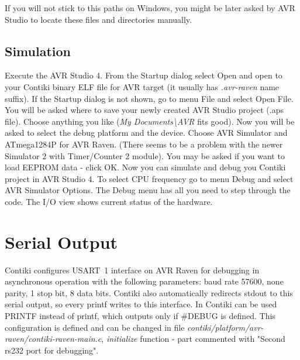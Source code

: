 \documentclass{article}
\begin{document}
{{If you will not stick to this paths on Windows,
you might be later asked by AVR Studio to locate these files and directories manually.

\subsection{Simulation}
Execute the AVR Studio 4.
From the Startup dialog select Open and open to your Contiki binary ELF file for AVR target
(it usually has {\it{.avr-raven}} name suffix).
If the Startup dialog is not shown, go to menu File and select Open File.
You will be asked where to save your newly created AVR Studio project (.aps file).
Choose anything you like ({\it{My Documents\textbackslash AVR}} fits good).
Now you will be asked to select the debug platform and the device.
Choose AVR Simulator and ATmega1284P for AVR Raven. (There seems to be a problem with the newer Simulator 2 with Timer/Counter 2 module).
You may be asked if you want to load EEPROM data - click OK.
Now you can simulate and debug you Contiki project in AVR Studio 4.
To select CPU frequency go to menu Debug and select AVR Simulator Options.
The Debug menu has all you need to step through the code. The I/O view shows current status of the hardware.


\section{Serial Output}
Contiki configures USART~1 interface on AVR Raven for debugging in asynchronous operation
with the following parameters:
baud rate 57600, none parity, 1 stop bit, 8 data bits.
Contiki also automatically redirects stdout to this serial output, so every printf
writes to this interface.
In Contiki can be used PRINTF instead of printf, which outputs only if \#DEBUG is defined.
This configuration is defined and can be changed in
file {\it{contiki/platform/avr-raven/contiki-raven-main.c}},
{\it{initialize}} function - part commented with "Second rs232 port for debugging".

}}
\end{document}
